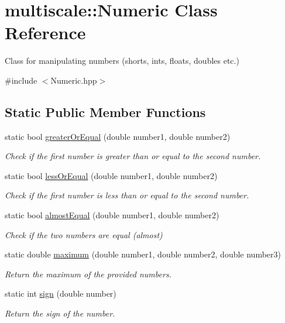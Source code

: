 \hypertarget{classmultiscale_1_1Numeric}{\section{multiscale\-:\-:\-Numeric \-Class \-Reference}
\label{classmultiscale_1_1Numeric}
}


\-Class for manipulating numbers (shorts, ints, floats, doubles etc.)  




{\ttfamily \#include $<$\-Numeric.\-hpp$>$}

\subsection*{\-Static \-Public \-Member \-Functions}
\begin{DoxyCompactItemize}
\item 
static bool \hyperlink{classmultiscale_1_1Numeric_a13ae1e2b35654937bed4c19e776ccdb5}{greater\-Or\-Equal} (double number1, double number2)
\begin{DoxyCompactList}\small\item\em \-Check if the first number is greater than or equal to the second number. \end{DoxyCompactList}\item 
static bool \hyperlink{classmultiscale_1_1Numeric_a7f21159a23c71c1d37e1c487e9ff815c}{less\-Or\-Equal} (double number1, double number2)
\begin{DoxyCompactList}\small\item\em \-Check if the first number is less than or equal to the second number. \end{DoxyCompactList}\item 
static bool \hyperlink{classmultiscale_1_1Numeric_a996dda9f7361be59b4614eace0b93f24}{almost\-Equal} (double number1, double number2)
\begin{DoxyCompactList}\small\item\em \-Check if the two numbers are equal (almost) \end{DoxyCompactList}\item 
static double \hyperlink{classmultiscale_1_1Numeric_a54d5578d5980315b7bade31a5655cd72}{maximum} (double number1, double number2, double number3)
\begin{DoxyCompactList}\small\item\em \-Return the maximum of the provided numbers. \end{DoxyCompactList}\item 
static int \hyperlink{classmultiscale_1_1Numeric_a2b3058c5ad27aaaef338a29b96cdbced}{sign} (double number)
\begin{DoxyCompactList}\small\item\em \-Return the sign of the number. \end{DoxyCompactList}\end{DoxyCompactItemize}
